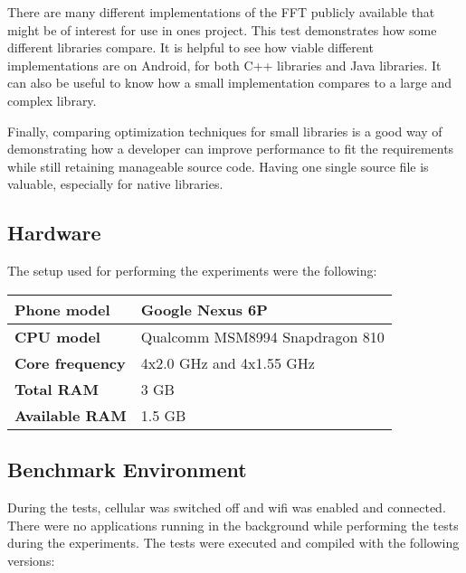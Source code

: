 There are many different implementations of the FFT publicly available that might be of interest for use in ones project. This test demonstrates how some different libraries compare. It is helpful to see how viable different implementations are on Android, for both C++ libraries and Java libraries. It can also be useful to know how a small implementation compares to a large and complex library.

Finally, comparing optimization techniques for small libraries is a good way of demonstrating how a developer can improve performance to fit the requirements while still retaining manageable source code. Having one single source file is valuable, especially for native libraries.

\subsection{Hardware}
The setup used for performing the experiments were the following:

\begin{table}[H]
    \centering
    \begin{tabular}{|l|l|}
        \hline
        \textbf{Phone model} & Google Nexus 6P\\
        \hline
        \textbf{CPU model} & Qualcomm MSM8994 Snapdragon 810\\
        \hline
        \textbf{Core frequency} & 4x2.0 GHz and 4x1.55 GHz\\
        \hline
        \textbf{Total RAM} & 3 GB\\
        \hline
        \textbf{Available RAM} & 1.5 GB\\
        \hline
    \end{tabular}
\end{table}

\subsection{Benchmark Environment}
During the tests, cellular was switched off and wifi was enabled and connected. There were no applications running in the background while performing the tests during the experiments. The tests were executed and compiled with the following versions:


